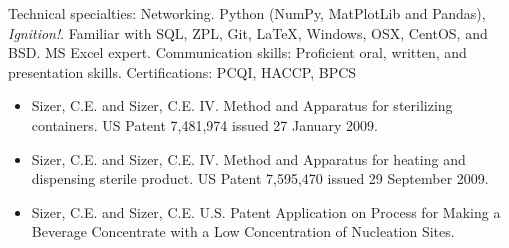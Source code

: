 \documentclass[10pt,letterpaper]{article} %
\begin{document}

\inlineheadsection %
{Technical specialties:}
{Networking. Python (NumPy, MatPlotLib and Pandas), \textit{Ignition!}.  Familiar with SQL, ZPL, Git, \LaTeX, Windows, OSX, CentOS, and BSD. MS Excel expert. }
\vspace{2mm}
\inlineheadsection
{Communication skills:}
{Proficient oral, written, and presentation skills. }
\vspace{2mm}
\inlineheadsection
{Certifications:}
{PCQI, HACCP, BPCS}




\spacedhrule{1.6em}{-0.4em} %



\begin{itemize}
\item[] Sizer, C.E.  and Sizer, C.E. IV.  Method and Apparatus for sterilizing containers.   US Patent 7,481,974 issued 27 January 2009.
\item[] Sizer, C.E. and Sizer, C.E. IV.   Method and Apparatus for heating and dispensing sterile product.   US Patent 7,595,470 issued 29 September 2009.
\item[] Sizer, C.E. and Sizer, C.E. U.S. Patent Application on Process for Making a Beverage Concentrate with a Low Concentration of Nucleation Sites.
\end{itemize}



%
\end{document}
